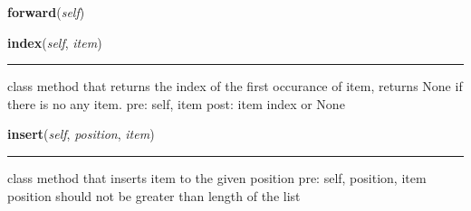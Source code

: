     \label{coinor:blimpy:LinkedList':LinkedList:forward}

    \vspace{0.5ex}

\hspace{.8\funcindent}\begin{boxedminipage}{\funcwidth}

    \raggedright \textbf{forward}(\textit{self})

\setlength{\parskip}{2ex}
\setlength{\parskip}{1ex}
    \end{boxedminipage}

    \label{coinor:blimpy:LinkedList':LinkedList:index}

    \vspace{0.5ex}

\hspace{.8\funcindent}\begin{boxedminipage}{\funcwidth}

    \raggedright \textbf{index}(\textit{self}, \textit{item})

    \vspace{-1.5ex}

    \rule{\textwidth}{0.5\fboxrule}
\setlength{\parskip}{2ex}
    class method that returns the index of the first occurance of item, 
    returns None if there is no any item. pre: self, item post: item index 
    or None

\setlength{\parskip}{1ex}
    \end{boxedminipage}

    \label{coinor:blimpy:LinkedList':LinkedList:insert}

    \vspace{0.5ex}

\hspace{.8\funcindent}\begin{boxedminipage}{\funcwidth}

    \raggedright \textbf{insert}(\textit{self}, \textit{position}, \textit{item})

    \vspace{-1.5ex}

    \rule{\textwidth}{0.5\fboxrule}
\setlength{\parskip}{2ex}
    class method that inserts item to the given position pre: self, 
    position, item position should not be greater than length of the list

\setlength{\parskip}{1ex}
    \end{boxedminipage}

